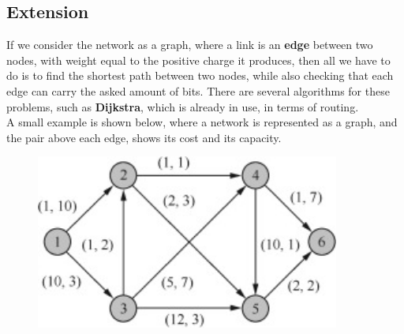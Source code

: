 \documentclass[12pt]{article}
\begin{document}
\subsection*{Extension}
If we consider the network as a graph, where a link is an \textbf{edge} between two nodes, with weight equal to the positive charge it produces, then all we have to do is to find the shortest path between two nodes, while also checking that each edge can carry the asked amount of bits. 
There are several algorithms for these problems, such as \textbf{Dijkstra}, which is already in use, in terms of routing. \\
A small example is shown below, where a network is represented as a graph, and the pair above each edge, shows its cost and its capacity.
\newline \newline
\begin{figure}[h!]
  \begin{center}
  \includegraphics[width=10cm]{netgraph.jpg}
  \end{center}
\end{figure}
\newpage

\end{document}
